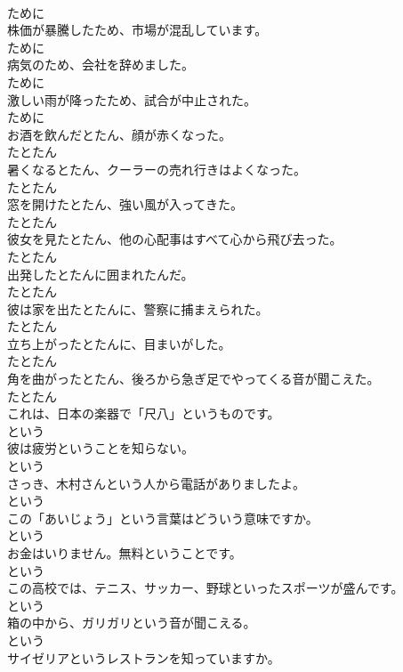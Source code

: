 \documentclass[8pt]{extreport}
\begin{document}
\begin{CJK}{UTF8}{min}
\\	ために
\\	株価が暴騰したため、市場が混乱しています。	
\\	ために
\\	病気のため、会社を辞めました。	
\\	ために
\\	激しい雨が降ったため、試合が中止された。	
\\	ために
\\	お酒を飲んだとたん、顔が赤くなった。	
\\	たとたん
\\	暑くなるとたん、クーラーの売れ行きはよくなった。	
\\	たとたん
\\	窓を開けたとたん、強い風が入ってきた。	
\\	たとたん
\\	彼女を見たとたん、他の心配事はすべて心から飛び去った。	
\\	たとたん
\\	出発したとたんに囲まれたんだ。	
\\	たとたん
\\	彼は家を出たとたんに、警察に捕まえられた。	
\\	たとたん
\\	立ち上がったとたんに、目まいがした。	
\\	たとたん
\\	角を曲がったとたん、後ろから急ぎ足でやってくる音が聞こえた。	
\\	たとたん
\\	これは、日本の楽器で「尺八」というものです。	
\\	という
\\	彼は疲労ということを知らない。	
\\	という
\\	さっき、木村さんという人から電話がありましたよ。	
\\	という
\\	この「あいじょう」という言葉はどういう意味ですか。	
\\	という
\\	お金はいりません。無料ということです。	
\\	という
\\	この高校では、テニス、サッカー、野球といったスポーツが盛んです。	
\\	という
\\	箱の中から、ガリガリという音が聞こえる。	
\\	という
\\	サイゼリアというレストランを知っていますか。	

\end{CJK}
\end{document}
